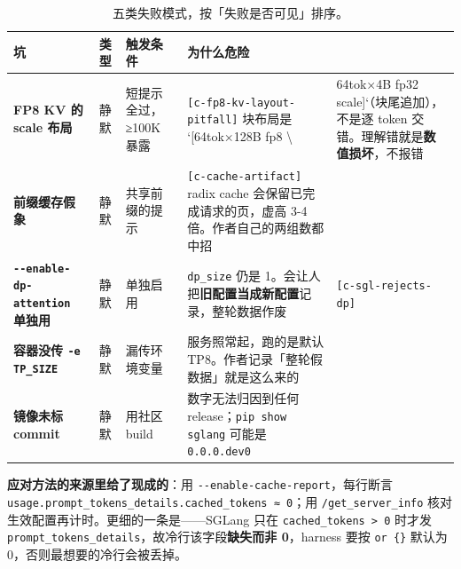 \begin{table}[t]
\centering
\footnotesize
\setlength{\tabcolsep}{4pt}
\caption{五类失败模式，按「失败是否可见」排序。}
\label{tab:13}
\begin{tabularx}{\textwidth}{XllXX}
\toprule
坑 & 类型 & 触发条件 & 为什么危险 &  \\
\midrule
\textbf{FP8 KV 的 scale 布局} & 静默 & 短提示全过，≥100K 暴露 & {\scriptsize\texttt{[c-\hspace{0pt}fp8-\hspace{0pt}kv-\hspace{0pt}layout-\hspace{0pt}pitfall]}} 块布局是 `[64tok×128B fp8 \textbackslash{} & 64tok×4B fp32 scale]`（块尾追加），不是逐 token 交错。理解错就是\textbf{数值损坏}，不报错 \\
\textbf{前缀缓存假象} & 静默 & 共享前缀的提示 & {\scriptsize\texttt{[c-\hspace{0pt}cache-\hspace{0pt}artifact]}} radix cache 会保留已完成请求的页，虚高 3-\hspace{0pt}4 倍。作者自己的两组数都中招 &  \\
\textbf{\texttt{-\allowbreak{}-\allowbreak{}enable-\allowbreak{}dp-\allowbreak{}attention} 单独用} & 静默 & 单独启用 & \texttt{dp\_size} 仍是 1。会让人把\textbf{旧配置当成新配置}记录，整轮数据作废 & {\scriptsize\texttt{[c-\hspace{0pt}sgl-\hspace{0pt}rejects-\hspace{0pt}dp]}} \\
\textbf{容器没传 \texttt{-e TP\_SIZE}} & 静默 & 漏传环境变量 & 服务照常起，跑的是默认 TP8。作者记录「整轮假数据」就是这么来的 &  \\
\textbf{镜像未标 commit} & 静默 & 用社区 build & 数字无法归因到任何 release；\texttt{pip\allowbreak{} show\allowbreak{} sglang} 可能是 \texttt{0.0.0.dev0} &  \\
\bottomrule
\end{tabularx}
\end{table}

\textbf{应对方法的来源里给了现成的}：用 \texttt{-\allowbreak{}-\allowbreak{}enable-\allowbreak{}cache-\allowbreak{}report}，每行断言\texttt{usage.prompt\_tokens\_details.cached\_tokens\allowbreak{} ≈\allowbreak{} 0}；用 \texttt{/get\_server\_info} 核对生效配置再计时。更细的一条是——SGLang 只在 \texttt{cached\_tokens\allowbreak{} >\allowbreak{} 0} 时才发 \texttt{prompt\_tokens\_details}，故冷行该字段\textbf{缺失而非 0}，harness 要按 \texttt{or \{\}} 默认为 0，否则最想要的冷行会被丢掉。


